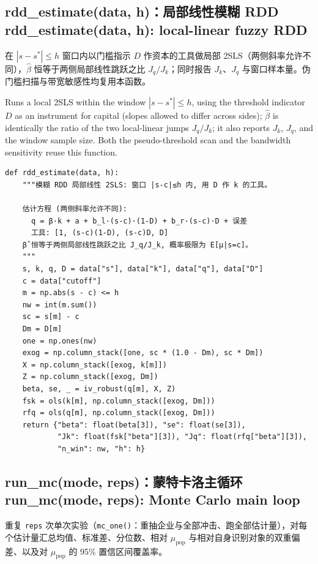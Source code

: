 \documentclass[12pt,a4paper]{ctexart}
\begin{document}
\subsection[rdd\_estimate]{rdd\_estimate(data, h)：局部线性模糊 RDD\\[1pt]\normalsize rdd\_estimate(data, h): local-linear fuzzy RDD}

在 $|s - s^*| \le h$ 窗口内以门槛指示 $D$ 作资本的工具做局部 2SLS（两侧斜率允许不同），$\hat{\beta}$ 恒等于两侧局部线性跳跃之比 $J_q/J_k$；同时报告 $J_k$、$J_q$ 与窗口样本量。伪门槛扫描与带宽敏感性均复用本函数。

Runs a local 2SLS within the window $|s-s^*|\le h$, using the threshold indicator $D$ as an instrument for capital (slopes allowed to differ across sides); $\hat\beta$ is identically the ratio of the two local-linear jumps $J_q/J_k$; it also reports $J_k$, $J_q$, and the window sample size. Both the pseudo-threshold scan and the bandwidth sensitivity reuse this function.

\begin{lstlisting}[style=pycode]
def rdd_estimate(data, h):
    """模糊 RDD 局部线性 2SLS: 窗口 |s-c|≤h 内, 用 D 作 k 的工具。

    估计方程 (两侧斜率允许不同):
      q = β·k + a + b_l·(s-c)·(1-D) + b_r·(s-c)·D + 误差
      工具: [1, (s-c)(1-D), (s-c)D, D]
    β̂ 恒等于两侧局部线性跳跃之比 J_q/J_k, 概率极限为 E[μ|s=c]。
    """
    s, k, q, D = data["s"], data["k"], data["q"], data["D"]
    c = data["cutoff"]
    m = np.abs(s - c) <= h
    nw = int(m.sum())
    sc = s[m] - c
    Dm = D[m]
    one = np.ones(nw)
    exog = np.column_stack([one, sc * (1.0 - Dm), sc * Dm])
    X = np.column_stack([exog, k[m]])
    Z = np.column_stack([exog, Dm])
    beta, se, _ = iv_robust(q[m], X, Z)
    fsk = ols(k[m], np.column_stack([exog, Dm]))
    rfq = ols(q[m], np.column_stack([exog, Dm]))
    return {"beta": float(beta[3]), "se": float(se[3]),
            "Jk": float(fsk["beta"][3]), "Jq": float(rfq["beta"][3]),
            "n_win": nw, "h": h}
\end{lstlisting}

\subsection[run\_mc]{run\_mc(mode, reps)：蒙特卡洛主循环\\[1pt]\normalsize run\_mc(mode, reps): Monte Carlo main loop}

重复 \texttt{reps} 次单次实验（\texttt{mc\_one()}：重抽企业与全部冲击、跑全部估计量），对每个估计量汇总均值、标准差、分位数、相对 $\mu_{\mathrm{pop}}$ 与相对自身识别对象的双重偏差、以及对 $\mu_{\mathrm{pop}}$ 的 95\% 置信区间覆盖率。
\end{document}
